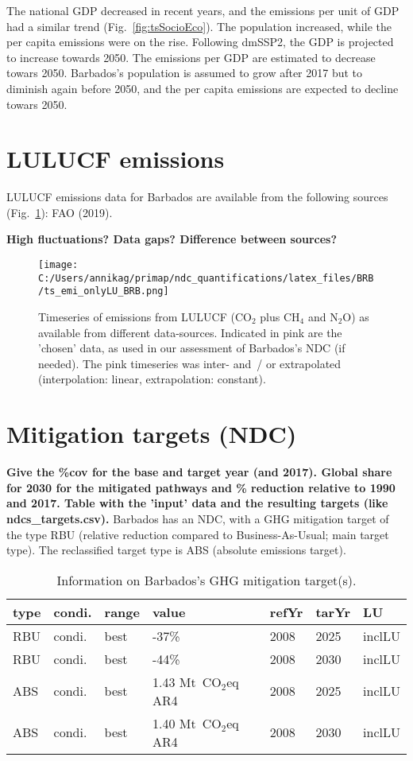 \documentclass[12pt]{article}
\begin{document}
 The national GDP decreased in recent years, and the emissions per unit of GDP had a similar trend (Fig.~\ref{fig:tsSocioEco}).
 The population increased, while the per capita emissions were on the rise. 
 Following dmSSP2, the GDP is projected to increase towards 2050. 
 The emissions per GDP are estimated to decrease towars 2050. 
 Barbados's population is assumed to grow after 2017 but to diminish again before 2050, and the per capita emissions are expected to decline towars 2050. 

 \newpage %
 \section{LULUCF emissions}
 \label{sec:emiLULUCF}
 LULUCF emissions data for Barbados are available from the following sources (Fig.~\ref{fig:tsLULUCF}): FAO (2019).

 \textbf{High fluctuations? Data gaps? Difference between sources?}

 \begin{figure}[H]
 \centering
 \texttt{[image: C:/Users/annikag/primap/ndc\_quantifications/latex\_files/BRB/ts\_emi\_onlyLU\_BRB.png]}
 \caption{Timeseries of emissions from LULUCF (CO$_2$ plus CH$_4$ and N$_2$O) as available from different data-sources. 
 Indicated in pink are the 'chosen' data, as used in our assessment of Barbados's NDC (if needed). 
 The pink timeseries was inter- and~/ or extrapolated (interpolation: linear, extrapolation: constant).}
 \label{fig:tsLULUCF}
 \end{figure}

 \newpage %
 \section{Mitigation targets (NDC)}
 \label{sec:mitiTars}

 \textbf{ 
 Give the \%cov for the base and target year (and 2017).
 Global share for 2030 for the mitigated pathways and \% reduction relative to 1990 and 2017.
 Table with the 'input' data and the resulting targets (like ndcs\_targets.csv).}
 Barbados has an NDC, with a GHG mitigation target of the type RBU (relative reduction compared to Business-As-Usual; main target type).
 The reclassified target type is ABS (absolute emissions target).

 \begin{table}[H]
 \centering
 \caption{Information on Barbados's GHG mitigation target(s).}
 \label{tab:mitiTars}
 \begin{tabular}{l l l l l l l }
 \bfseries type & \bfseries condi. & \bfseries range & \bfseries value & \bfseries refYr & \bfseries tarYr & \bfseries LU \tabularnewline \hline
 RBU & condi. & best & -37\% & 2008 & 2025 & inclLU \tabularnewline 
 RBU & condi. & best & -44\% & 2008 & 2030 & inclLU \tabularnewline 
 ABS & condi. & best & 1.43 Mt~CO$_2$eq AR4 & 2008 & 2025 & inclLU \tabularnewline 
 ABS & condi. & best & 1.40 Mt~CO$_2$eq AR4 & 2008 & 2030 & inclLU \tabularnewline 
 \end{tabular}
 \end{table}
\end{document}
